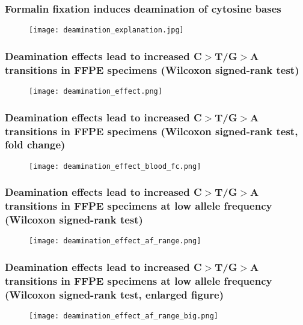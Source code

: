 \documentclass{beamer}
\begin{document}
\begin{frame}
\frametitle{Formalin fixation induces deamination of cytosine bases}
\begin{figure}[t]
    \texttt{[image: deamination\_explanation.jpg]}
\end{figure}
\end{frame}

\begin{frame}
\frametitle{Deamination effects lead to increased C$>$T/G$>$A transitions in FFPE specimens (Wilcoxon signed-rank test)}
\begin{figure}[t]
    \texttt{[image: deamination\_effect.png]}
\end{figure}
\end{frame}

\begin{frame}
\frametitle{Deamination effects lead to increased C$>$T/G$>$A transitions in FFPE specimens (Wilcoxon signed-rank test, fold change)}
\begin{figure}[t]
    \texttt{[image: deamination\_effect\_blood\_fc.png]}
\end{figure}
\end{frame}

\begin{frame}
\frametitle{Deamination effects lead to increased C$>$T/G$>$A transitions in FFPE specimens at low allele frequency (Wilcoxon signed-rank test)}
\begin{figure}[t]
    \texttt{[image: deamination\_effect\_af\_range.png]}
\end{figure}
\end{frame}

\begin{frame}
\frametitle{Deamination effects lead to increased C$>$T/G$>$A transitions in FFPE specimens at low allele frequency (Wilcoxon signed-rank test, enlarged figure)}
\begin{figure}[t]
    \texttt{[image: deamination\_effect\_af\_range\_big.png]}
\end{figure}
\end{frame}
\end{document}
